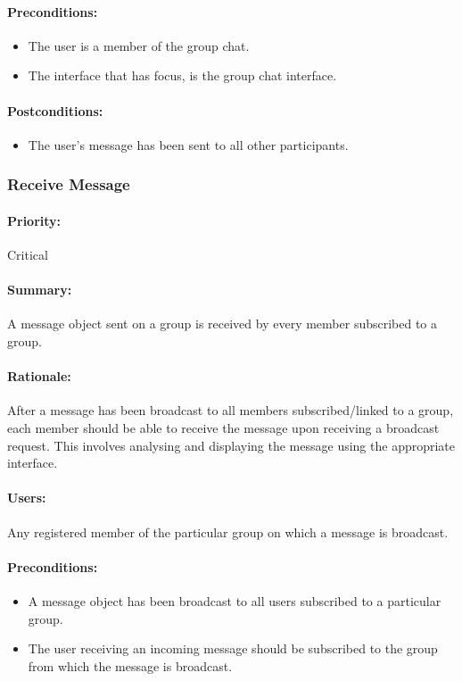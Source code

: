 \documentclass[11pt]{article}
\begin{document}
\paragraph{Preconditions:} 
\begin{itemize}
\item The user is a member of the group chat.
\item The interface that has focus, is the group chat interface.
\end{itemize}
\paragraph{{Postconditions:}}
\begin{itemize}
\item The user's message has been sent to all other participants.
\end{itemize}

\subsubsection{Receive Message} \label{UC-receive-message}
\paragraph{Priority:} Critical
\paragraph{Summary:} A message object sent on a group is received by every member subscribed to a group.
\paragraph{Rationale:} After a message has been broadcast to all members subscribed/linked to a group, each member should be able to receive the message upon receiving a broadcast request. This involves analysing and displaying the message using the appropriate interface. 
\paragraph{Users:} Any registered member of the particular group on which a message is broadcast.
\paragraph{Preconditions:} 
\begin{itemize}
\item A message object has been broadcast to all users subscribed to a particular group.
\item The user receiving an incoming message should be subscribed to the group from which the message is broadcast.
\end{itemize}
\end{document}
